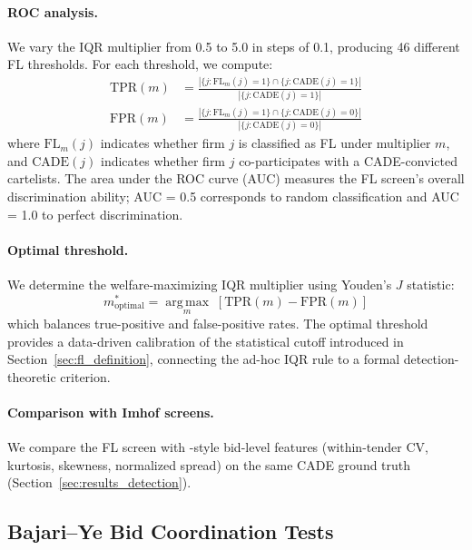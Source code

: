 \paragraph{ROC analysis.}
We vary the IQR multiplier from 0.5 to 5.0 in steps of 0.1, producing
46 different FL thresholds. For each threshold, we compute:
\begin{align}
  \text{TPR}(m) &= \frac{|\{j : \text{FL}_m(j)=1\} \cap
    \{j : \text{CADE}(j)=1\}|}{|\{j : \text{CADE}(j)=1\}|}
  \label{eq:tpr} \\
  \text{FPR}(m) &= \frac{|\{j : \text{FL}_m(j)=1\} \cap
    \{j : \text{CADE}(j)=0\}|}{|\{j : \text{CADE}(j)=0\}|}
  \label{eq:fpr}
\end{align}
where $\text{FL}_m(j)$ indicates whether firm $j$ is classified as FL
under multiplier $m$, and $\text{CADE}(j)$ indicates whether firm $j$
co-participates with a CADE-convicted cartelists. The area under the ROC
curve (AUC) measures the FL screen's overall discrimination ability; AUC
= 0.5 corresponds to random classification and AUC = 1.0 to perfect
discrimination.

\paragraph{Optimal threshold.}
We determine the welfare-maximizing IQR multiplier using Youden's $J$
statistic:
\begin{equation}
  m^*_{\text{optimal}} = \operatorname*{arg\,max}_m \;
  \left[\text{TPR}(m) - \text{FPR}(m)\right]
  \label{eq:youden}
\end{equation}
which balances true-positive and false-positive rates. The optimal
threshold provides a data-driven calibration of the statistical cutoff
introduced in Section~\ref{sec:fl_definition}, connecting the ad-hoc
IQR rule to a formal detection-theoretic criterion.

\paragraph{Comparison with Imhof screens.} %
We compare the FL screen with \citet{imhof2019detecting}-style
bid-level features (within-tender CV, kurtosis, skewness, normalized
spread) on the same CADE ground truth (Section~\ref{sec:results_detection}).


\subsection{Bajari--Ye Bid Coordination Tests} %
\label{sec:bajari_ye}

